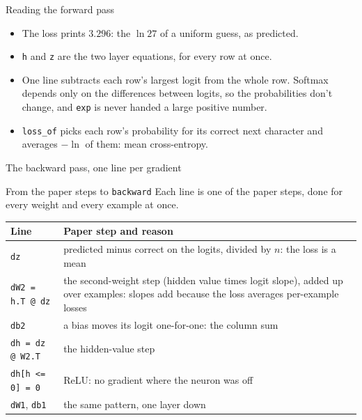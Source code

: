 \documentclass[aspectratio=169,11pt,t,\primeropts]{beamer}
\begin{document}
\begin{frame}{Reading the forward pass}
  \begin{itemize}
    \item The loss prints $3.296$: the $\ln 27$ of a uniform guess, as predicted.
    \item \texttt{h} and \texttt{z} are the two layer equations, for every row at once.
    \item One line subtracts each row's largest logit from the whole row. Softmax depends only
      on the differences between logits, so the probabilities don't change, and \texttt{exp} is
      never handed a large positive number.
    \item \texttt{loss\_of} picks each row's probability for its correct next character and
      averages $-\ln$ of them: mean cross-entropy.
  \end{itemize}
\end{frame}

\begin{frame}{The backward pass, one line per gradient}
\end{frame}

\begin{frame}{From the paper steps to \texttt{backward}}
  Each line is one of the paper steps, done for every weight and every example at once.
  \vspace{2mm}
  \begin{center}\small
  \begin{tabular}{@{}L{0.27\textwidth}L{0.62\textwidth}@{}}
    \toprule
    \textbf{Line} & \textbf{Paper step and reason}\\
    \midrule
    \texttt{dz} & predicted minus correct on the logits, divided by $n$: the loss is a mean\\
    \texttt{dW2 = h.T @ dz} & the second-weight step (hidden value times logit slope), added up
      over examples: slopes add because the loss averages per-example losses\\
    \texttt{db2} & a bias moves its logit one-for-one: the column sum\\
    \texttt{dh = dz @ W2.T} & the hidden-value step\\
    \texttt{dh[h <= 0] = 0} & ReLU: no gradient where the neuron was off\\
    \texttt{dW1}, \texttt{db1} & the same pattern, one layer down\\
    \bottomrule
  \end{tabular}
  \end{center}
\end{frame}
\end{document}
